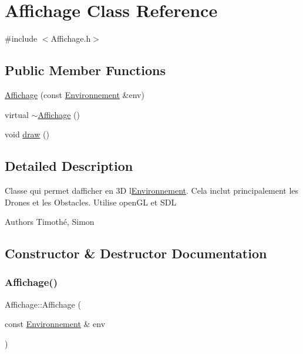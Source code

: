 \hypertarget{class_affichage}{}\section{Affichage Class Reference}
\label{class_affichage}


{\ttfamily \#include $<$Affichage.\+h$>$}

\subsection*{Public Member Functions}
\begin{DoxyCompactItemize}
\item 
\mbox{\hyperlink{class_affichage_a2d2fa64d39fe6bd5c9d5f5d7304925bf}{Affichage}} (const \mbox{\hyperlink{class_environnement}{Environnement}} \&env)
\item 
virtual \mbox{\hyperlink{class_affichage_ae6a4f4db7a0d8d2abc8bd44c1be674c0}{$\sim$\+Affichage}} ()
\item 
void \mbox{\hyperlink{class_affichage_a7d0c9a0ff4f073097ec5e4c1b1b50d7a}{draw}} ()
\end{DoxyCompactItemize}


\subsection{Detailed Description}
Classe qui permet d\textquotesingle{}afficher en 3D l\textquotesingle{}\mbox{\hyperlink{class_environnement}{Environnement}}. Cela inclut principalement les Drones et les Obstacles. Utilise open\+GL et S\+DL \begin{DoxyAuthor}{Authors}
Timothé, Simon 
\end{DoxyAuthor}


\subsection{Constructor \& Destructor Documentation}
\mbox{\label{class_affichage_a2d2fa64d39fe6bd5c9d5f5d7304925bf}} 
\subsubsection{\texorpdfstring{Affichage()}{Affichage()}}
{\footnotesize\ttfamily Affichage\+::\+Affichage (\begin{DoxyParamCaption}\item[{const \mbox{\hyperlink{class_environnement}{Environnement}} \&}]{env }\end{DoxyParamCaption})}

